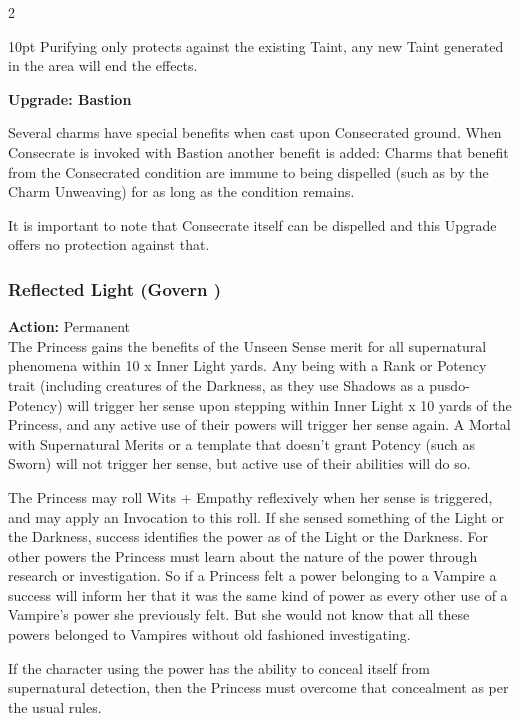 \begin{multicols}{2}
\begin{myindentpar}{10pt}
Purifying only protects against the existing Taint, any new Taint generated in the area will end the effects.

\textbf{Upgrade: Bastion}

Several charms have special benefits when cast upon Consecrated ground. When Consecrate is invoked with Bastion another benefit is added: Charms that benefit from the Consecrated condition are immune to being dispelled (such as by the Charm Unweaving) for as long as the condition remains.

It is important to note that Consecrate itself can be dispelled and this Upgrade offers no protection against that.

\end{myindentpar}

\subsubsection*{Reflected Light (Govern \textbullet)}

\noindent \textbf{Action:} Permanent\\ 

\noindent The Princess gains the benefits of the Unseen Sense merit for all supernatural phenomena within 10 x Inner Light yards. Any being with a Rank or Potency trait (including creatures of the Darkness, as they use Shadows as a pusdo-Potency) will trigger her sense upon stepping within Inner Light x 10 yards of the Princess, and any active use of their powers will trigger her sense again. A Mortal with Supernatural Merits or a template that doesn't grant Potency (such as Sworn) will not trigger her sense, but active use of their abilities will do so. 

The Princess may roll Wits + Empathy reflexively when her sense is triggered, and may apply an Invocation to this roll. If she sensed something of the Light or the Darkness, success identifies the power as of the Light or the Darkness. For other powers the Princess must learn about the nature of the power through research or investigation. So if a Princess felt a power belonging to a Vampire a success will inform her that it was the same kind of power as every other use of a Vampire's power she previously felt. But she would not know that all these powers belonged to Vampires without old fashioned investigating. 

If the character using the power has the ability to conceal itself from supernatural detection, then the Princess must overcome that concealment as per the usual rules.  


\end{multicols}
